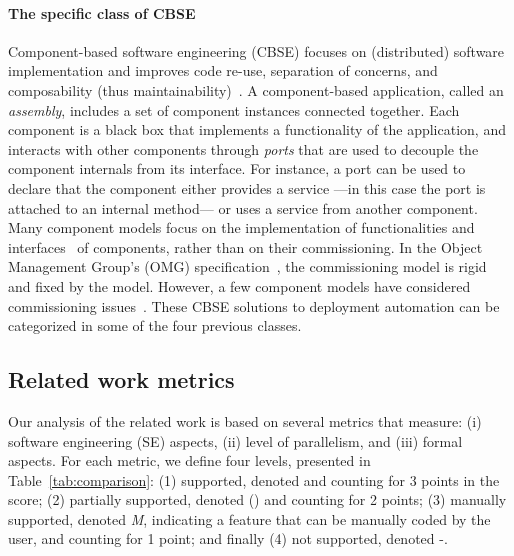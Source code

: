 \paragraph{The specific class of CBSE}
Component-based software engineering (CBSE) focuses on (distributed)
software implementation and improves code re-use, separation of
concerns, and composability (thus
maintainability)~\cite{Szyperski:2002:CSB:515228}. A component-based
application, called an \emph{assembly}, includes a set of component
instances connected together. Each component is a black box that
implements a functionality of the application, and interacts with
other components through \emph{ports} that are used to decouple the
component internals from its interface. For instance, a port can be
used to declare that the component either provides a service ---in
this case the port is attached to an internal method--- or uses a
service from another component. Many component models focus on the
implementation of functionalities and
interfaces~\cite{corba:omg06,Blair2009,baude:hal-01001043,Bernholdt01052006,bigot:inria-00388508,Coullon2017}
of components, rather than on their commissioning. In the Object
Management Group's (OMG) specification~\cite{ccmdeploy:omg06}, the
commissioning model is rigid and fixed by the model. However, a few
component models have considered commissioning issues~\cite{Blair2009,
  baude:hal-01001043, flissi2008ccgrid, chardet:hal-01858150,
  dicosmo2014ic}. These CBSE solutions to deployment automation can be
categorized in some of the four previous classes.

\subsection{Related work metrics}

Our analysis of the related work is based on several metrics that
measure: (i) software engineering (SE) aspects, (ii) level of
parallelism, and (iii) formal aspects. For each metric, we define four
levels, presented in Table~\ref{tab:comparison}: (1) supported, denoted
\checkmark and counting for 3 points in the score; (2) partially
supported, denoted (\checkmark) and counting for 2 points; (3)
manually supported, denoted \emph{M}, indicating a feature that can be
manually coded by the user, and counting for 1 point; and finally
(4) not supported, denoted -.

